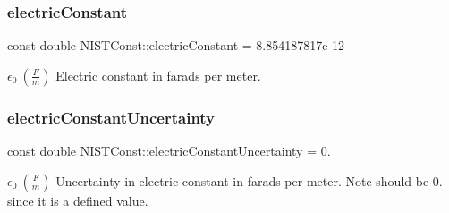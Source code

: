 \subsubsection{\texorpdfstring{electric\+Constant}{electricConstant}}
{\footnotesize\ttfamily const double N\+I\+S\+T\+Const\+::electric\+Constant = 8.\+854187817e-\/12}

$\epsilon_0 \ (\frac{F}{m})$ Electric constant in farads per meter. \mbox{\label{group___electric_constant_gaf65e89a9fe674a6f80f5a66bbe101aab}} 
\subsubsection{\texorpdfstring{electric\+Constant\+Uncertainty}{electricConstantUncertainty}}
{\footnotesize\ttfamily const double N\+I\+S\+T\+Const\+::electric\+Constant\+Uncertainty = 0.}

$\epsilon_0 \ (\frac{F}{m})$ Uncertainty in electric constant in farads per meter. Note should be 0. since it is a defined value. 